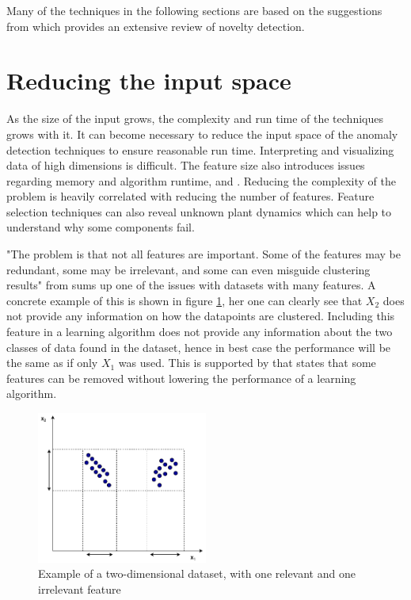     Many of the techniques in the following sections are based on the suggestions from \cite{Pimentel2014} which provides an extensive review of novelty detection. 

\section{Reducing the input space}\label{sec:reduce_features}
    As the size of the input grows, the complexity and run time of the techniques grows with it. It can become necessary to reduce the input space of the anomaly detection techniques to ensure reasonable run time. Interpreting and visualizing data of high dimensions is difficult. The feature size also introduces issues regarding memory and algorithm runtime, \cite{Guyon2003} and \cite{Dy2004}. Reducing the complexity of the problem is heavily correlated with reducing the number of features. Feature selection techniques can also reveal unknown plant dynamics which can help to understand why some components fail.
    
    "The problem is that not all features are important. Some of the features may be redundant, some may be irrelevant, and some can even misguide clustering results" from \cite{Dy2004} sums up one of the issues with datasets with many features. A concrete example of this is shown in figure \ref{fig:feature_selection}, her one can clearly see that $X_2$ does not provide any information on how the datapoints are clustered. Including this feature in a learning algorithm does not provide any information about the two classes of data found in the dataset, hence in best case the performance will be the same as if only $X_1$ was used. This is supported by \cite{Liu2010} that states that some features can be removed without lowering the performance of a learning algorithm.
    
    \begin{figure}
        \centering
        \includegraphics[width=0.5\textwidth]{report/figures/techniques/feature_selection.pdf}
        \caption{Example of a two-dimensional dataset, with one relevant and one irrelevant feature}
        \label{fig:feature_selection}
    \end{figure}
    
